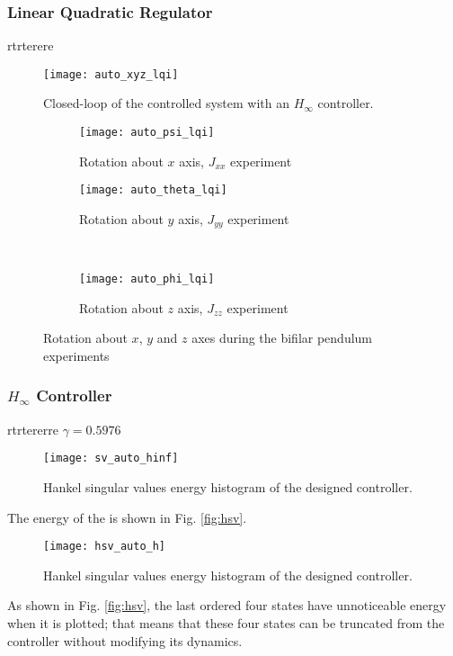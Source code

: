 \subsubsection{Linear Quadratic Regulator}
rtrterere
\begin{figure}[h]
	\begin{center}
	\texttt{[image: auto\_xyz\_lqi]}
	\caption{Closed-loop of the controlled system with an $H_{\infty}$ controller.}
	\label{fig:auto_xyz_lqi}
	\end{center}
	\end{figure}
	
\begin{figure}[H]
\begin{subfigure}{.5\linewidth}
\centering
\texttt{[image: auto\_psi\_lqi]}
\caption{Rotation about $x$ axis, $J_{xx}$ experiment}
\label{fig:auto_psi_lqi}
\end{subfigure}%
\begin{subfigure}{.5\linewidth}
\centering
\texttt{[image: auto\_theta\_lqi]}
\caption{Rotation about $y$ axis, $J_{yy}$ experiment}
\label{fig:auto_theta_lqi}
\end{subfigure}\\[1ex]
\begin{subfigure}{\linewidth}
\centering
\texttt{[image: auto\_phi\_lqi]}
\caption{Rotation about $z$ axis, $J_{zz}$ experiment}
\label{fig:auto_psi_lqi}
\end{subfigure}
\caption{Rotation about $x$, $y$ and $z$ axes during the bifilar pendulum experiments}
\label{fig:auto_lqi}
\end{figure}

\subsubsection{$H_\infty$ Controller}
rtrtererre
$\gamma = 0.5976$
\begin{figure}[h]
\begin{center}
\texttt{[image: sv\_auto\_hinf]}  
\caption{Hankel singular values energy histogram of the designed controller.} 
\label{fig:sv_auto_hinf}
\end{center}
\end{figure}

The energy of the  is shown in Fig. \ref{fig:hsv}.
\begin{figure}[h]
\begin{center}
\texttt{[image: hsv\_auto\_h]}  
\caption{Hankel singular values energy histogram of the designed controller.} 
\label{fig:hsv_auto_h}
\end{center}
\end{figure}
As shown in Fig. \ref{fig:hsv}, the last ordered four states have unnoticeable energy when it is plotted; that means that these four states can be truncated from the controller without modifying its dynamics.

